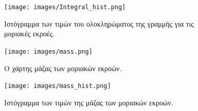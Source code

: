 \documentclass[a4paper,12pt]{memoir}
\begin{document}
\begin{figure}[h]
	\centering
	\texttt{[image: images/Integral\_hist.png]}
	\caption{Ιστόγραμμα των τιμών του ολοκληρώματος της γραμμής  για τις μοριακές εκροές.}
\end{figure}


\begin{figure}[h]
	\centering
	\texttt{[image: images/mass.png]}
	\caption{Ο χάρτης μάζας των μοριακών εκροών.}
	\centering
	\texttt{[image: images/mass\_hist.png]}
	\caption{Ιστόγραμμα των τιμών της μάζας των μοριακών εκροών.}
\end{figure}


\printbibliography
\end{document}

